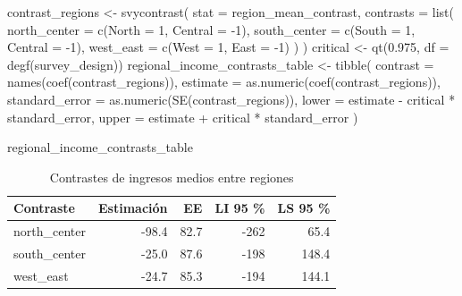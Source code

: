 \documentclass[
  spanish,
  11pt,
  letterpaper,
  oneside,
  open=any]{scrbook}
\newenvironment{Shaded}{\begin{snugshade}}{\end{snugshade}}
\newcommand{\AttributeTok}[1]{\textcolor[rgb]{0.40,0.45,0.13}{#1}}
\newcommand{\DecValTok}[1]{\textcolor[rgb]{0.68,0.00,0.00}{#1}}
\newcommand{\FloatTok}[1]{\textcolor[rgb]{0.68,0.00,0.00}{#1}}
\newcommand{\FunctionTok}[1]{\textcolor[rgb]{0.28,0.35,0.67}{#1}}
\newcommand{\NormalTok}[1]{\textcolor[rgb]{0.00,0.23,0.31}{#1}}
\newcommand{\OtherTok}[1]{\textcolor[rgb]{0.00,0.23,0.31}{#1}}
\newcommand{\SpecialCharTok}[1]{\textcolor[rgb]{0.37,0.37,0.37}{#1}}
\begin{document}
\begin{Shaded}
\begin{Highlighting}[]
\NormalTok{contrast\_regions }\OtherTok{\textless{}{-}} \FunctionTok{svycontrast}\NormalTok{(}
  \AttributeTok{stat =}\NormalTok{ region\_mean\_contrast,}
  \AttributeTok{contrasts =} \FunctionTok{list}\NormalTok{(}
    \AttributeTok{north\_center =} \FunctionTok{c}\NormalTok{(}\AttributeTok{North =} \DecValTok{1}\NormalTok{, }\AttributeTok{Central =} \SpecialCharTok{{-}}\DecValTok{1}\NormalTok{),}
    \AttributeTok{south\_center =} \FunctionTok{c}\NormalTok{(}\AttributeTok{South =} \DecValTok{1}\NormalTok{, }\AttributeTok{Central =} \SpecialCharTok{{-}}\DecValTok{1}\NormalTok{),}
    \AttributeTok{west\_east =} \FunctionTok{c}\NormalTok{(}\AttributeTok{West =} \DecValTok{1}\NormalTok{, }\AttributeTok{East =} \SpecialCharTok{{-}}\DecValTok{1}\NormalTok{)}
\NormalTok{  )}
\NormalTok{)}
\NormalTok{critical }\OtherTok{\textless{}{-}} \FunctionTok{qt}\NormalTok{(}\FloatTok{0.975}\NormalTok{, }\AttributeTok{df =} \FunctionTok{degf}\NormalTok{(survey\_design))}
\NormalTok{regional\_income\_contrasts\_table }\OtherTok{\textless{}{-}} \FunctionTok{tibble}\NormalTok{(}
  \AttributeTok{contrast =} \FunctionTok{names}\NormalTok{(}\FunctionTok{coef}\NormalTok{(contrast\_regions)),}
  \AttributeTok{estimate =} \FunctionTok{as.numeric}\NormalTok{(}\FunctionTok{coef}\NormalTok{(contrast\_regions)),}
  \AttributeTok{standard\_error =} \FunctionTok{as.numeric}\NormalTok{(}\FunctionTok{SE}\NormalTok{(contrast\_regions)),}
  \AttributeTok{lower =}\NormalTok{ estimate }\SpecialCharTok{{-}}\NormalTok{ critical }\SpecialCharTok{*}\NormalTok{ standard\_error,}
  \AttributeTok{upper =}\NormalTok{ estimate }\SpecialCharTok{+}\NormalTok{ critical }\SpecialCharTok{*}\NormalTok{ standard\_error}
\NormalTok{)}

\NormalTok{regional\_income\_contrasts\_table}
\end{Highlighting}
\end{Shaded}

{

\begin{longtable}[]{@{}lrrrr@{}}

\caption{\label{tbl-contraste-regiones}Contrastes de ingresos medios
entre regiones}

\tabularnewline

\toprule\noalign{}
Contraste & Estimación & EE & LI 95 \% & LS 95 \% \\
\midrule\noalign{}
\endhead
\bottomrule\noalign{}
\endlastfoot
north\_center & -98.4 & 82.7 & -262 & 65.4 \\
south\_center & -25.0 & 87.6 & -198 & 148.4 \\
west\_east & -24.7 & 85.3 & -194 & 144.1 \\

\end{longtable}

}
\end{document}
